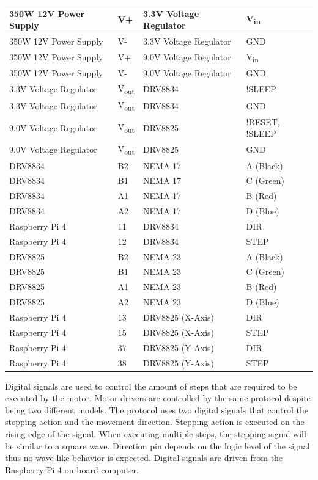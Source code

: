 \documentclass{article}
\begin{document}
\begin{singlespace}
\begin{xltabular}{\textwidth}{|X|l|X|l|}
        350W 12V Power Supply & V+ & 3.3V Voltage Regulator &  V\textsubscript{in} \\ \hline
        350W 12V Power Supply & V- & 3.3V Voltage Regulator & GND \\ \hline
        350W 12V Power Supply & V+ & 9.0V Voltage Regulator &  V\textsubscript{in} \\ \hline
        350W 12V Power Supply & V- & 9.0V Voltage Regulator & GND \\ \hline
        3.3V Voltage Regulator & V\textsubscript{out} & DRV8834 & !SLEEP \\ \hline
        3.3V Voltage Regulator & V\textsubscript{out} & DRV8834 & GND \\ \hline
        9.0V Voltage Regulator & V\textsubscript{out} & DRV8825 & !RESET, !SLEEP \\ \hline
        9.0V Voltage Regulator & V\textsubscript{out} & DRV8825 & GND \\ \hline
        DRV8834 & B2 & NEMA 17 & A (Black) \\ \hline
        DRV8834 & B1 & NEMA 17 & C (Green) \\ \hline
        DRV8834 & A1 & NEMA 17 & B (Red) \\ \hline
        DRV8834 & A2 & NEMA 17 & D (Blue) \\ \hline
        Raspberry Pi 4 & 11 & DRV8834 & DIR \\ \hline
        Raspberry Pi 4 & 12 & DRV8834 & STEP \\ \hline
        DRV8825 & B2 & NEMA 23 & A (Black) \\ \hline
        DRV8825 & B1 & NEMA 23 & C (Green) \\ \hline
        DRV8825 & A1 & NEMA 23 & B (Red) \\ \hline
        DRV8825 & A2 & NEMA 23 & D (Blue) \\ \hline
        Raspberry Pi 4 & 13 & DRV8825 (X-Axis) & DIR \\ \hline
        Raspberry Pi 4 & 15 & DRV8825 (X-Axis) & STEP \\ \hline
        Raspberry Pi 4 & 37 & DRV8825 (Y-Axis) & DIR \\ \hline
        Raspberry Pi 4 & 38 & DRV8825 (Y-Axis) & STEP \\ \hline
    \end{xltabular}
\end{singlespace}

Digital signals are used to control the amount of steps that are required to be executed by the motor. Motor drivers are controlled by the same protocol despite being two different models. The protocol uses two digital signals that control the stepping action and the movement direction. Stepping action is executed on the rising edge of the signal. When executing multiple steps, the stepping signal will be similar to a square wave. Direction pin depends on the logic level of the signal thus no wave-like behavior is expected. Digital signals are driven from the Raspberry Pi 4 on-board computer.
\end{document}

